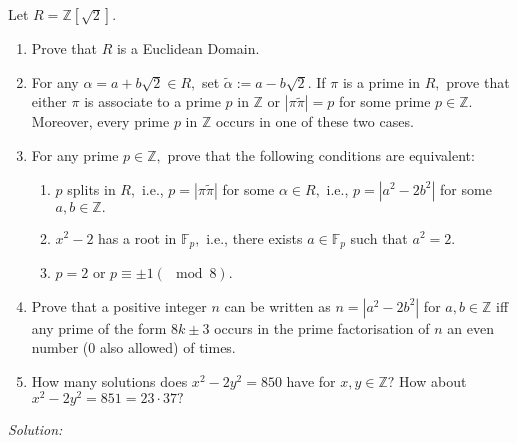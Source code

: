 \documentclass[]{article}
\begin{document}
\section{}
Let $R=\mathbb{Z}[\sqrt{2}]$.
\begin{enumerate}
	\item Prove that $R$ is a Euclidean Domain.
	\item For any $\alpha=a+b\sqrt{2} \in R,$ set $\tilde{\alpha}:= a-b\sqrt{2}.$ If $\pi$ is a prime in $R,$ prove that either $\pi$ is associate to a prime $p$ in $\mathbb{Z}$ or $|\pi \tilde{\pi}|=p$ for some prime $p \in \mathbb{Z}.$ Moreover, every prime $p$ in $\mathbb{Z}$ occurs in one of these two cases.
	\item For any prime $p \in \mathbb{Z},$ prove that the following conditions are equivalent: 
	\begin{enumerate}
		\item $p$ splits in $R,$ i.e., $p=|\pi \tilde{\pi}|$ for some $\alpha \in R,$ i.e., $p=|a^2-2b^2|$ for some $a,b \in \mathbb{Z}.$
		\item $x^2-2$ has a root in $\mathbb{F}_p,$ i.e., there exists $a \in \mathbb{F}_p$ such that $a^2=2.$
		\item $p=2$ or $p \equiv \pm 1 (\mod 8).$ 
	\end{enumerate}
	\item Prove that a positive integer $n$ can be written as $n=|a^2-2b^2|$ for $a,b \in \mathbb{Z}$ iff any prime of the form $8k\pm 3$ occurs in the prime factorisation of $n$ an even number ($0$ also allowed) of times.
	\item How many solutions does $x^2-2y^2=850$ have for $x,y \in \mathbb{Z}?$ How about $x^2-2y^2=851=23\cdot 37?$
\end{enumerate}
\emph{Solution:} 
\end{document}
